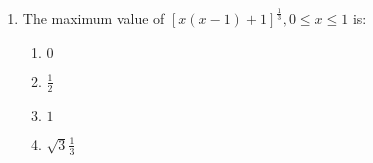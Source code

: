 \begin{enumerate}
  	\begin{enumerate}
    	\item $ \frac{1}{2} $
    	\item $ 1 $
    	\item $ 2 $
    	\item $ 3 $
  	\end{enumerate}

\item The maximum value  of $ [x(x - 1) + 1]^\frac{1}{3},  0 \le x \le 1 $ is:
  
  	\begin{enumerate}
    	\item $0$
    	\item $\frac{1}{2}$
    	\item $1$
    	\item $\sqrt3  \frac{1}{3}$
  	\end{enumerate}



\end{enumerate}

%
